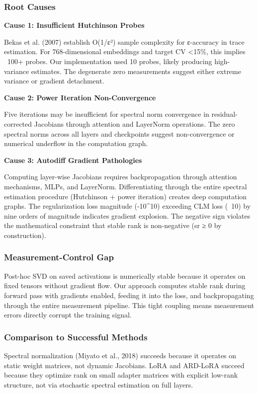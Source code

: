
\subsubsection{Root Causes}

\textbf{Cause 1: Insufficient Hutchinson Probes}

Bekas et al. (2007) establish O(1/ε²) sample complexity for ε-accuracy in trace estimation. For 768-dimensional embeddings and target CV <15\%, this implies ~100+ probes. Our implementation used 10 probes, likely producing high-variance estimates. The degenerate zero measurements suggest either extreme variance or gradient detachment.

\textbf{Cause 2: Power Iteration Non-Convergence}

Five iterations may be insufficient for spectral norm convergence in residual-corrected Jacobians through attention and LayerNorm operations. The zero spectral norms across all layers and checkpoints suggest non-convergence or numerical underflow in the computation graph.

\textbf{Cause 3: Autodiff Gradient Pathologies}

Computing layer-wise Jacobians requires backpropagation through attention mechanisms, MLPs, and LayerNorm. Differentiating through the entire spectral estimation procedure (Hutchinson + power iteration) creates deep computation graphs. The regularization loss magnitude (-10^10) exceeding CLM loss (~10) by nine orders of magnitude indicates gradient explosion. The negative sign violates the mathematical constraint that stable rank is non-negative (sr ≥ 0 by construction).

\subsubsection{Measurement-Control Gap}

Post-hoc SVD on saved activations is numerically stable because it operates on fixed tensors without gradient flow. Our approach computes stable rank during forward pass with gradients enabled, feeding it into the loss, and backpropagating through the entire measurement pipeline. This tight coupling means measurement errors directly corrupt the training signal.

\subsubsection{Comparison to Successful Methods}

Spectral normalization (Miyato et al., 2018) succeeds because it operates on static weight matrices, not dynamic Jacobians. LoRA and ARD-LoRA succeed because they optimize rank on small adapter matrices with explicit low-rank structure, not via stochastic spectral estimation on full layers.
